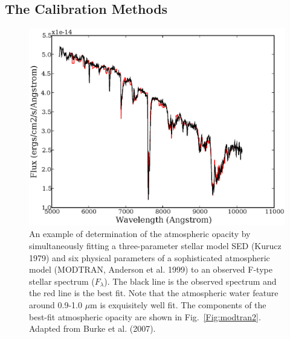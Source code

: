 \documentclass{emulateapj}
\begin{document}
\subsection{ The Calibration Methods }


\begin{figure}
\hskip -0.12in
\includegraphics[width=1.1\hsize,clip]{modtran1.ps}
\caption{An example of determination of the atmospheric opacity by 
simultaneously fitting a three-parameter stellar model SED (Kurucz 1979) and 
six physical parameters of a sophisticated atmospheric model (MODTRAN, Anderson 
et al. 1999) to an observed F-type stellar spectrum ($F_\lambda$). The black 
line is the observed spectrum and the red line is the best fit. Note that the 
atmospheric water feature around 0.9-1.0 $\mu$m is exquisitely well fit. 
The components of the best-fit atmospheric opacity are shown in 
Fig.~\ref{Fig:modtran2}. Adapted from Burke et al. (2007).}
\label{Fig:modtran1}
\end{figure}
\end{document}
